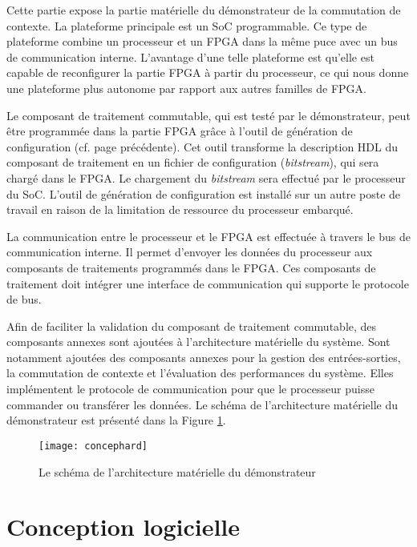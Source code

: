 Cette partie expose la partie matérielle du démonstrateur de la commutation de contexte.
La plateforme principale est un SoC programmable. Ce type de plateforme
combine un processeur et un FPGA dans la même puce avec un bus de communication interne. L'avantage d'une telle plateforme
est qu'elle est capable de reconfigurer la partie FPGA à partir du processeur, ce qui nous donne une plateforme plus autonome
par rapport aux autres familles de FPGA.

Le composant de traitement commutable, qui est testé par le démonstrateur, peut être programmée dans la partie 
FPGA grâce à l'outil de génération de configuration (cf. page précédente).
Cet outil transforme la description HDL du composant de traitement en un fichier de configuration (\emph{bitstream}), qui sera
chargé dans le FPGA. Le chargement du \emph{bitstream} sera effectué par le processeur du SoC.
L'outil de génération de configuration est installé sur un autre poste de travail en raison de la limitation de ressource du processeur embarqué.

La communication entre le processeur et le FPGA est effectuée à travers le bus de communication interne.
Il permet d'envoyer les données du processeur aux composants de traitements programmés dans le FPGA.
Ces composants de traitement doit intégrer une interface de communication
qui supporte le protocole de bus.

Afin de faciliter la validation du composant de traitement commutable, des composants 
annexes sont ajoutées à l'architecture matérielle du système.
Sont notamment ajoutées des composants annexes pour la gestion des entrées-sorties, la commutation de contexte et l'évaluation
des performances du système. Elles implémentent le protocole de communication pour que le processeur puisse
commander ou transférer les données.
Le schéma de l'architecture matérielle du démonstrateur est présenté
dans la Figure \ref{fig:concephard}.

\begin{figure}[h]
	\centering
	\texttt{[image: concephard]}
	\caption{Le schéma de l'architecture matérielle du démonstrateur}
	\label{fig:concephard}
	\vspace{-2mm}
\end{figure}

\section{Conception logicielle}
\label{sec:concepsoft}

